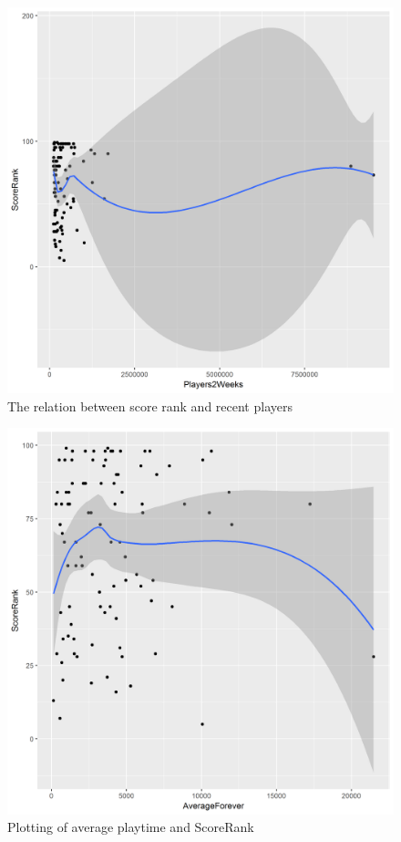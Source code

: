 \documentclass[figures_tabs.tex]{subfiles}
\begin{document}
\begin{figure}[H]
    \centering
    \includegraphics[scale=0.5]{img/players_t.png}
    \caption{The relation between score rank and recent players}
    \label{fig:players_t}
\end{figure}

\begin{figure}[H]
    \centering
    \includegraphics[scale=0.5]{img/avg_f.png}
    \caption{Plotting of average playtime and ScoreRank}
    \label{fig:avg_f}
\end{figure}
\end{document}
